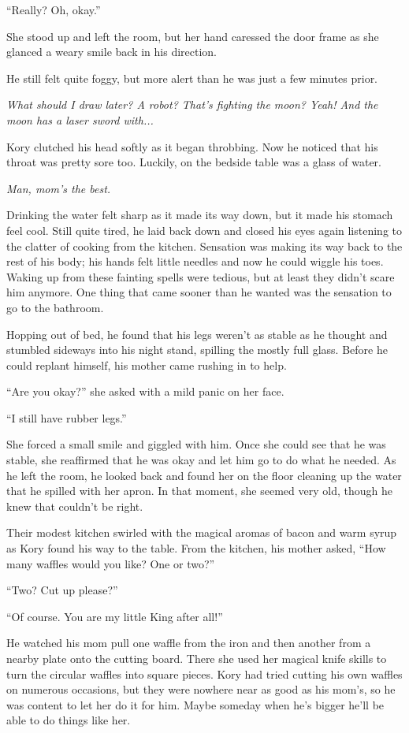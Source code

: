 ``Really? Oh, okay.''

She stood up and left the room, but her hand caressed the door frame as she glanced a weary smile back in his direction.

He still felt quite foggy, but more alert than he was just a few minutes prior.

\textit{What should I draw later? A robot? That's fighting the moon? Yeah! And the moon has a laser sword with...}

Kory clutched his head softly as it began throbbing. Now he noticed that his throat was pretty sore too. Luckily, on the bedside table was a glass of water.

\textit{Man, mom's the best.}

Drinking the water felt sharp as it made its way down, but it made his stomach feel cool. Still quite tired, he laid back down and closed his eyes again listening to the clatter of cooking from the kitchen. Sensation was making its way back to the rest of his body; his hands felt little needles and now he could wiggle his toes. Waking up from these fainting spells were tedious, but at least they didn't scare him anymore. One thing that came sooner than he wanted was the sensation to go to the bathroom.

Hopping out of bed, he found that his legs weren't as stable as he thought and stumbled sideways into his night stand, spilling the mostly full glass. Before he could replant himself, his mother came rushing in to help.

``Are you okay?'' she asked with a mild panic on her face.

``I still have rubber legs.''

She forced a small smile and giggled with him. Once she could see that he was stable, she reaffirmed that he was okay and let him go to do what he needed. As he left the room, he looked back and found her on the floor cleaning up the water that he spilled with her apron. In that moment, she seemed very old, though he knew that couldn't be right.

\line

Their modest kitchen swirled with the magical aromas of bacon and warm syrup as Kory found his way to the table. From the kitchen, his mother asked, ``How many waffles would you like? One or two?''

``Two? Cut up please?''

``Of course. You are my little King after all!''

He watched his mom pull one waffle from the iron and then another from a nearby plate onto the cutting board. There she used her magical knife skills to turn the circular waffles into square pieces. Kory had tried cutting his own waffles on numerous occasions, but they were nowhere near as good as his mom's, so he was content to let her do it for him. Maybe someday when he's bigger he'll be able to do things like her.

